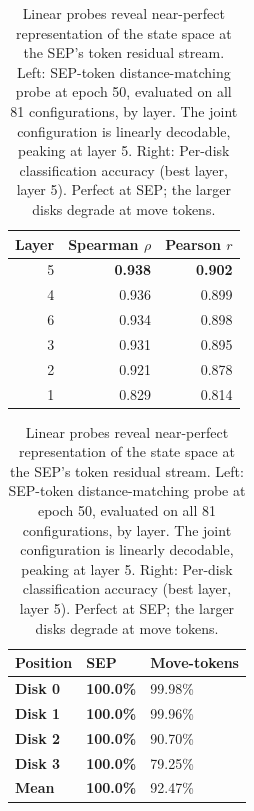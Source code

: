 \documentclass{article} %
\begin{document}
\begin{table}[t]
  \centering
  \caption{Linear probes reveal near-perfect representation of the state space at the SEP's token residual stream. Left: SEP-token distance-matching probe at epoch 50, evaluated on all 81 configurations, by layer. The joint configuration is linearly decodable, peaking at layer 5. Right: Per-disk classification accuracy (best layer, layer 5). Perfect at SEP; the larger disks degrade at move tokens.
 }
  \label{tab:sep-probe}
  \begin{tabular}{rrr}
    \toprule
    \textbf{Layer} & \textbf{Spearman $\rho$} & \textbf{Pearson $r$} \\
    \midrule
    5 & \textbf{0.938} & \textbf{0.902} \\
    4 & 0.936 & 0.899 \\
    6 & 0.934 & 0.898 \\
    3 & 0.931 & 0.895 \\
    2 & 0.921 & 0.878 \\
    1 & 0.829 & 0.814 \\
    \bottomrule
  \end{tabular}
%
\hspace{1cm}
  \label{tab:per-disk}
  \begin{tabular}{l|ll}
    \toprule
    \textbf{Position} & SEP & Move-tokens \\ \midrule
    \textbf{Disk 0} & \textbf{100.0\%} & 99.98\% \\
    \textbf{Disk 1} & \textbf{100.0\%} & 99.96\% \\
    \textbf{Disk 2} & \textbf{100.0\%} & 90.70\% \\ 
    \textbf{Disk 3} & \textbf{100.0\%} & 79.25\% \\ \midrule
    \textbf{Mean} & \textbf{100.0\%} & 92.47\% 
    \bottomrule
  \end{tabular}
\end{table}

\end{document}
